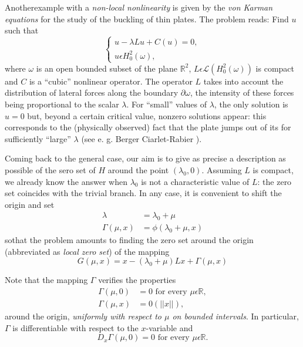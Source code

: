 Another\pageoriginale example with a {\em non-local nonlinearity} is given by the {\em von Karman equations} for the study of the buckling of thin plates. The problem reads: Find $u$ such that
\begin{equation*}
\begin{cases}
u - \lambda L u + C(u) = 0,\\
u \epsilon H_{0}^{2} (\omega),
\end{cases}
\end{equation*}
where $\omega$ is an open bounded subset of the plane $\mathbb{R}^{2}$, $L \epsilon \mathscr{L} (H_{0}^{2} (\omega))$ is compact and $C$ is a ``cubic'' nonlinear operator. The operator $L$ takes into account the distribution of lateral forces along the boundary $\partial \omega$, the intensity of these forces being proportional to the scalar $\lambda$. For ``small'' values of $\lambda$, the only solution is $u = 0$ but, beyond a certain critical value, nonzero solutions appear: this corresponds to the (physically observed) fact that the plate jumps out of its for sufficiently ``large'' $\lambda$ (see e. g. Berger \cite{1} Ciarlet-Rabier \cite{6}).

Coming back to the general case, our aim is to give as precise a description as possible of the sero set of $H$ around the point $(\lambda_{0}, 0)$. Assuming $L$ is compact, we already know the answer when $\lambda_{0}$ is not a characteristic value of $L$: the zero set coincides with the trivial branch. In any case, it is convenient to shift the origin and set
\begin{align*}
\lambda & = \lambda_{0} + \mu\tag{1.4}\label{chap1-eq1.4}\\
\Gamma (\mu, x) & = \phi (\lambda_{0} + \mu, x)\tag{1.5}\label{chap1-eq1.5}
\end{align*}
so\pageoriginale that the problem amounts to finding the zero set around the origin (abbreviated as {\em local zero set}) of the mapping
\begin{equation*}
G(\mu, x) = x - (\lambda_{0} + \mu) Lx + \Gamma(\mu, x)\tag{1.6}\label{chap1-eq1.6}
\end{equation*}

Note that the mapping $\Gamma$ verifies the properties
\begin{align*}
\Gamma (\mu, 0) & = 0 \text{ for every } \mu \epsilon \mathbb{R},\tag{1.7}\label{chap1-eq1.7}\\
\Gamma(\mu, x) & = 0(||x||),\tag{1.8}\label{chap1-eq1.8}
\end{align*}
around the origin, {\em uniformly with respect to $\mu$ on bounded intervals}. In particular, $\Gamma$ is differentiable with respect to the $x$-variable and 
\begin{equation*}
D_{x} \Gamma (\mu, 0) = 0 \text{ for every } \mu \epsilon \mathbb{R}.\tag{1.9}\label{chap1-eq1.9}
\end{equation*}


